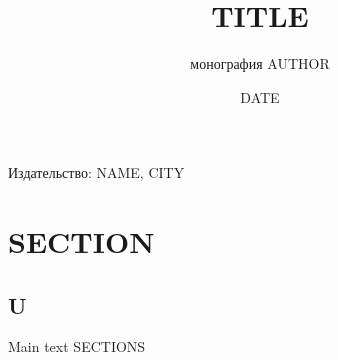 \documentclass{article}
\title{TITLE}
\author{монография AUTHOR}
\date{DATE}
\begin{document}
\maketitle  

\vfill  %
\begin{center}
    Издательство: NAME, CITY
\end{center}

\newpage  %

\section{SECTION} 

\subsection{U}

Main text 
{{SECTIONS}}
\end{document}

